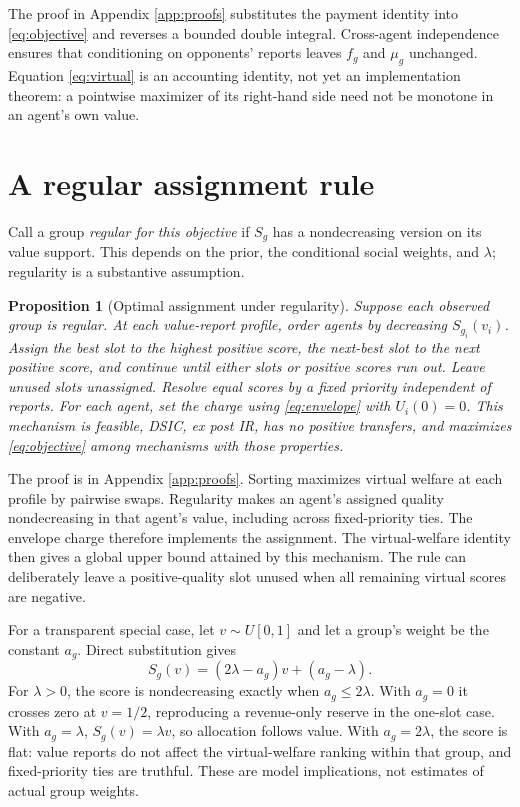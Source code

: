 \documentclass[11pt]{article}
\newtheorem{proposition}{Proposition}
\begin{document}
The proof in Appendix \ref{app:proofs} substitutes the payment identity into \eqref{eq:objective} and reverses a bounded double integral. Cross-agent independence ensures that conditioning on opponents' reports leaves $f_g$ and $\mu_g$ unchanged. Equation \eqref{eq:virtual} is an accounting identity, not yet an implementation theorem: a pointwise maximizer of its right-hand side need not be monotone in an agent's own value.

\section{A regular assignment rule}\label{sec:regular}

Call a group \emph{regular for this objective} if $S_g$ has a nondecreasing version on its value support. This depends on the prior, the conditional social weights, and $\lambda$; regularity is a substantive assumption.

\begin{proposition}[Optimal assignment under regularity]\label{prop:optimal}
Suppose each observed group is regular. At each value-report profile, order agents by decreasing $S_{g_i}(v_i)$. Assign the best slot to the highest positive score, the next-best slot to the next positive score, and continue until either slots or positive scores run out. Leave unused slots unassigned. Resolve equal scores by a fixed priority independent of reports. For each agent, set the charge using \eqref{eq:envelope} with $U_i(0)=0$. This mechanism is feasible, DSIC, ex post IR, has no positive transfers, and maximizes \eqref{eq:objective} among mechanisms with those properties.
\end{proposition}

The proof is in Appendix \ref{app:proofs}. Sorting maximizes virtual welfare at each profile by pairwise swaps. Regularity makes an agent's assigned quality nondecreasing in that agent's value, including across fixed-priority ties. The envelope charge therefore implements the assignment. The virtual-welfare identity then gives a global upper bound attained by this mechanism. The rule can deliberately leave a positive-quality slot unused when all remaining virtual scores are negative.

For a transparent special case, let $v\sim U[0,1]$ and let a group's weight be the constant $a_g$. Direct substitution gives
\begin{equation}\label{eq:linear}
S_g(v)=(2\lambda-a_g)v+(a_g-\lambda).
\end{equation}
For $\lambda>0$, the score is nondecreasing exactly when $a_g\le2\lambda$. With $a_g=0$ it crosses zero at $v=1/2$, reproducing a revenue-only reserve in the one-slot case. With $a_g=\lambda$, $S_g(v)=\lambda v$, so allocation follows value. With $a_g=2\lambda$, the score is flat: value reports do not affect the virtual-welfare ranking within that group, and fixed-priority ties are truthful. These are model implications, not estimates of actual group weights.
\end{document}
